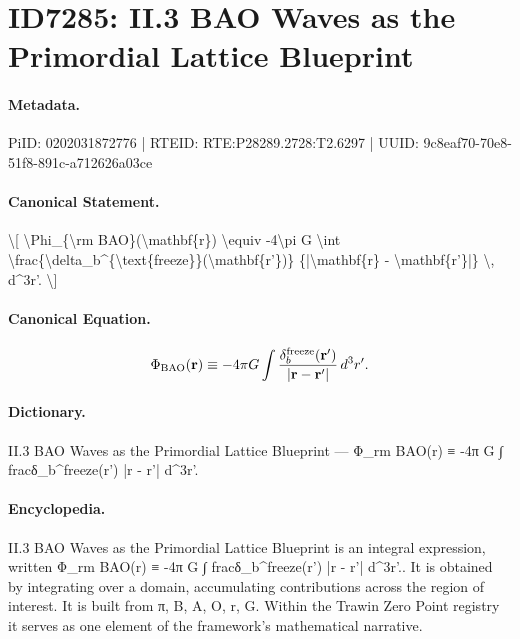 \section*{ID7285: II.3 BAO Waves as the Primordial Lattice Blueprint}
\paragraph{Metadata.}
PiID: 0202031872776 | RTEID: RTE:P28289.2728:T2.6297 | UUID: 9c8eaf70-70e8-51f8-891c-a712626a03ce

\paragraph{Canonical Statement.}
\textbackslash{}[ \textbackslash{}Phi\_\{\textbackslash{}rm BAO\}(\textbackslash{}mathbf\{r\}) \textbackslash{}equiv -4\textbackslash{}pi G \textbackslash{}int \textbackslash{}frac\{\textbackslash{}delta\_b\textasciicircum{}\{\textbackslash{}text\{freeze\}\}(\textbackslash{}mathbf\{r'\})\} \{|\textbackslash{}mathbf\{r\} - \textbackslash{}mathbf\{r'\}|\} \textbackslash{}, d\textasciicircum{}3r'. \textbackslash{}]

\paragraph{Canonical Equation.}
\[
\Phi_{\rm BAO}(\mathbf{r}) \equiv -4\pi G \int \frac{\delta_b^{\text{freeze}}(\mathbf{r'})} {|\mathbf{r} - \mathbf{r'}|} \, d^3r'.
\]

\paragraph{Dictionary.}
II.3 BAO Waves as the Primordial Lattice Blueprint — Φ\_rm BAO(r) ≡ -4π G ∫ fracδ\_b\textasciicircum{}freeze(r') |r - r'| d\textasciicircum{}3r'.

\paragraph{Encyclopedia.}
II.3 BAO Waves as the Primordial Lattice Blueprint is an integral expression, written Φ\_rm BAO(r) ≡ -4π G ∫ fracδ\_b\textasciicircum{}freeze(r') |r - r'| d\textasciicircum{}3r'.. It is obtained by integrating over a domain, accumulating contributions across the region of interest. It is built from π, B, A, O, r, G. Within the Trawin Zero Point registry it serves as one element of the framework's mathematical narrative.
